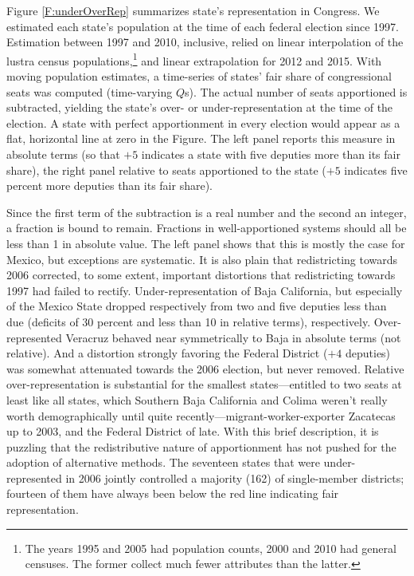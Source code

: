 \documentclass[letter,12pt]{article}
\begin{document}
Figure \ref{F:underOverRep} summarizes state's representation in Congress. We estimated each state's population at the time of each federal election since 1997. Estimation between 1997 and 2010, inclusive, relied on linear interpolation of the lustra census populations,\footnote{The years 1995 and 2005 had population counts, 2000 and 2010 had general censuses. The former collect much fewer attributes than the latter.} and linear extrapolation for 2012 and 2015. With moving population estimates, a time-series of states' fair share of congressional seats was computed (time-varying $Q$s). The actual number of seats apportioned is subtracted, yielding the state's over- or under-representation at the time of the election. A state with perfect apportionment in every election would appear as a flat, horizontal line at zero in the Figure. The left panel reports this measure in absolute terms (so that $+5$ indicates a state with five deputies more than its fair share), the right panel relative to seats apportioned to the state ($+5$ indicates five percent more deputies than its fair share).  

Since the first term of the subtraction is a real number and the second an integer, a fraction is bound to remain. Fractions in well-apportioned systems should all be less than 1 in absolute value. The left panel shows that this is mostly the case for Mexico, but exceptions are systematic. It is also plain that redistricting towards 2006 corrected, to some extent, important distortions that redistricting towards 1997 had failed to rectify. Under-representation of Baja California, but especially of the Mexico State dropped respectively from two and five deputies less than due (deficits of 30 percent and less than 10 in relative terms), respectively. Over-represented Veracruz behaved near symmetrically to Baja in absolute terms (not relative). And a distortion strongly favoring the Federal District ($+4$ deputies) was somewhat attenuated towards the 2006 election, but never removed. Relative over-representation is substantial for the smallest states---entitled to two seats at least like all states, which Southern Baja California and Colima weren't really worth demographically until quite recently---migrant-worker-exporter Zacatecas up to 2003, and the Federal District of late. With this brief description, it is puzzling that the redistributive nature of apportionment has not pushed for the adoption of alternative methods. The seventeen states that were under-represented in 2006 jointly controlled a majority (162) of single-member districts; fourteen of them have always been below the red line indicating fair representation. 
\end{document}
